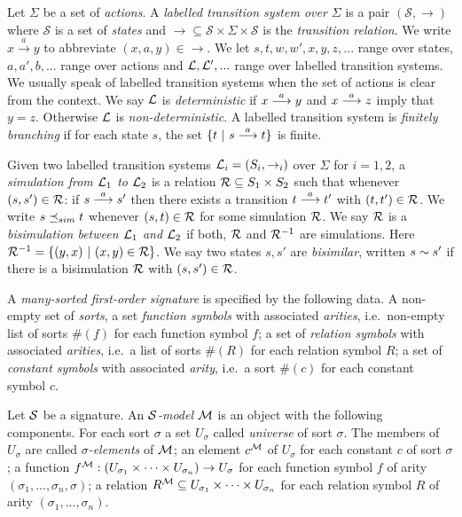 Let $\Sigma$ be a set of \emph{actions}.  A \emph{labelled transition
  system over $\Sigma$} is a pair $(\mathcal{S}, \rightarrow)$ where
$\mathcal{S}$ is a set of \emph{states} and $\rightarrow \subseteq
\mathcal{S} \times \Sigma \times \mathcal{S}$ is the \emph{transition
  relation}.  We write $x \xrightarrow{a} y$ to abbreviate $(x,a,y)
\in \rightarrow$. We let $s, t, w, w', x, y, z, ...$ range over
states, $a, a', b, ...$ range over actions and $\mathcal{L}, \mathcal{L}', ...$
range over labelled transition systems. We usually speak of labelled
transition systems  when the set of actions is clear from the
context.  We say $\mathcal{L}$ is \emph{deterministic} if $x \stackrel{a}{\longrightarrow} y$ and
$x \stackrel{a}{\longrightarrow} z$ imply that $y = z$. Otherwise $\mathcal{L}$ is
\emph{non-deterministic}.  A labelled transition system is
\emph{finitely branching} if for each state $s$, the set $\{t\ |\ s
\stackrel{a}{\longrightarrow} t\}$ is finite.

Given two labelled transition systems $\mathcal{L}_i = (S_i, \rightarrow_i)$
over $\Sigma$ for $i = 1, 2$, a \emph{simulation from $\mathcal{L}_1$ to
  $\mathcal{L}_2$} is a relation $\mathcal{R} \subseteq S_1 \times S_2$ such that
whenever $(s, s') \in \mathcal{R}$: if $s \stackrel{a}{\longrightarrow} s'$ then there exists a
transition $t \stackrel{a}{\longrightarrow} t'$ with $(t, t') \in \mathcal{R}$.  We write $s \preceq_{sim}
t$ whenever $(s, t) \in \mathcal{R}$ for some simulation $\mathcal{R}$.  We say
$\mathcal{R}$ is a \emph{bisimulation between $\mathcal{L}_1$ and $\mathcal{L}_2$} if both,
$\mathcal{R}$ and $\mathcal{R}^{-1}$ are simulations. Here $\mathcal{R}^{-1} = \{(y,
x)\ |\ (x, y) \in \mathcal{R}\}$.  We say two states $s, s'$ are
\emph{bisimilar}, written $s \sim s'$ if there is a bisimulation
$\mathcal{R}$ with $(s, s') \in \mathcal{R}$.

A \emph{many-sorted first-order signature} is specified by the
following data.  A non-empty set of \emph{sorts}, a set \emph{function
  symbols} with associated \emph{arities}, i.e.~non-empty list of
sorts $\#(f)$ for each function symbol $f$; a set of \emph{relation
  symbols} with associated \emph{arities}, i.e.~a list of sorts
$\#(R)$ for each relation symbol $R$; a set of \emph{constant symbols}
with associated \emph{arity}, i.e.~a sort $\#(c)$ for each constant
symbol $c$.

Let $\mathcal{S}$ be a signature. An \emph{$\mathcal{S}$-model} $\mathcal{M}$ is an
object with the following components.  For each sort $\sigma$ a set
$U_{\sigma}$ called \emph{universe} of sort $\sigma$.  The members of
$U_{\sigma}$ are called \emph{$\sigma$-elements} of $\mathcal{M}$; an
element $c^{\mathcal{M}}$ of $U_{\sigma}$ for each constant $c$ of sort
$\sigma$; a function $f^{\mathcal{M}} : (U_{\sigma_1}\times \dots \times
U_{\sigma_n}) \rightarrow U_{\sigma}$ for each function symbol $f$ of
arity $(\sigma_1, ..., \sigma_n, \sigma)$; a relation $R^{\mathcal{M}}
\subseteq U_{\sigma_1}\times \dots \times U_{\sigma_n}$ for each
relation symbol $R$ of arity $(\sigma_1, ..., \sigma_n)$.

